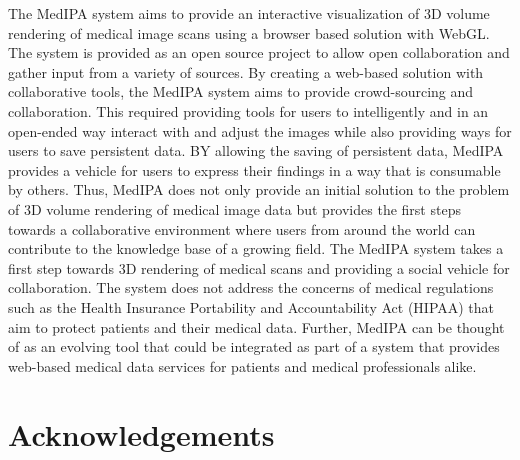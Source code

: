\documentclass[annual]{acmsiggraph}
\begin{document}
	The MedIPA system aims to provide an interactive visualization of 3D volume rendering of medical image scans using a browser based solution with WebGL.  The system is provided as an open source project to allow open collaboration and gather input from a variety of sources.  By creating a web-based solution with collaborative tools, the MedIPA system aims to provide crowd-sourcing and collaboration.  This required providing tools for users to intelligently and in an open-ended way interact with and adjust the images while also providing ways for users to save persistent data.  BY allowing the saving of persistent data, MedIPA provides a vehicle for users to express their findings in a way that is consumable by others.  Thus, MedIPA does not only provide an initial solution to the problem of 3D volume rendering of medical image data but provides the first steps towards a collaborative environment where users from around the world can contribute to the knowledge base of a growing field.
	The MedIPA system takes a first step towards 3D rendering of medical scans and providing a social vehicle for collaboration.  The system does not address the concerns of medical regulations such as the Health Insurance Portability and Accountability Act (HIPAA) that aim to protect patients and their medical data.  Further, MedIPA can be thought of as an evolving tool that could be integrated as part of a system that provides web-based medical data services for patients and medical professionals alike. 

\section*{Acknowledgements}




\end{document}
